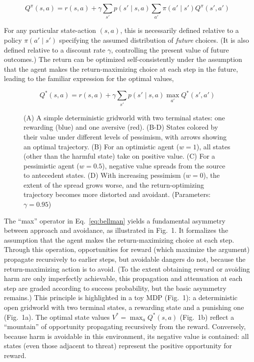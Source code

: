 \documentclass[manuscript]{stjour}
\begin{document}
\begin{equation}\label{eq:bellman_full}
Q^\pi(s,a) = r(s,a) + \gamma \sum_{s'} p(s' \mid s,a) \sum_{a'} \pi(a' \mid s') Q^\pi(s',a')
\end{equation}

For any particular state-action $(s,a)$, this is necessarily defined relative to a policy $\pi(a' \mid s')$ specifying the assumed distribution of \emph{future} choices. (It is also defined relative to a discount rate $\gamma$, controlling the present value of future outcomes.) The return can be optimized self-consistently under the assumption that the agent makes the return-maximizing choice at each step in the future, leading to the familiar expression for the optimal values,

\begin{equation}\label{eq:bellman}
 Q^*(s,a) = r(s,a) + \gamma \sum_{s'} p(s' \mid s,a) \max_{a'} Q^*(s',a')
\end{equation}

\begin{figure}[!b]
\caption{(A) A simple deterministic gridworld with two terminal states: one rewarding (blue) and one aversive (red). (B-D) States colored by their value under different levels of pessimism, with arrows showing an optimal trajectory. (B) For an optimistic agent ($w=1$), all states (other than the harmful state) take on positive value. (C) For a pessimistic agent ($w=0.5$), negative value spreads from the source to antecedent states. (D) With increasing pessimism ($w=0$), the extent of the spread grows worse, and the return-optimizing trajectory becomes more distorted and avoidant. (Parameters: $\gamma = 0.95$)}
\label{fig:field}
\end{figure}

The ``max'' operator in Eq.~\ref{eq:bellman} yields a fundamental asymmetry between approach and avoidance, as illustrated in Fig.~1. It formalizes the assumption that the agent makes the return-maximizing choice at each step. Through this operation, opportunities for reward (which maximize the argument) propagate recursively to earlier steps, but avoidable dangers do not, because the return-maximizing action is to avoid. (To the extent obtaining reward or avoiding harm are only imperfectly achievable, this propagation and attenuation at each step are graded according to success probability, but the basic asymmetry remains.) This principle is highlighted in a toy MDP (Fig.~1): a deterministic open gridworld with two terminal states, a rewarding state and a punishing one (Fig.~1a). The optimal state values $V^* = \max_a Q^*(s,a)$ (Fig.~1b) reflect a ``mountain'' of opportunity propagating recursively from the reward. Conversely, because harm is avoidable in this environment, its negative value is contained: all states (even those adjacent to threat) represent the positive opportunity for reward.
\end{document}
